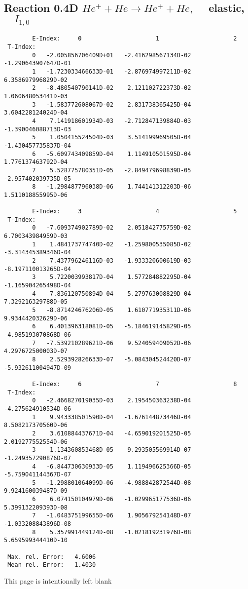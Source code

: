 \subsection{
Reaction 0.4D  $He^+ + He \rightarrow He^+ + He ,\quad$
 elastic, $\quad I_{1,0}$
}

\begin{verbatim}
        E-Index:     0                     1                     2
 T-Index:
        0   -2.005856706409D+01   -2.416298567134D-02   -1.290643907647D-01
        1   -1.723033466633D-01   -2.876974997211D-02    6.358697996829D-02
        2   -8.480540790141D-02    2.121102722373D-02    1.060648053441D-03
        3   -1.583772608067D-02    2.831738365425D-04    3.604228124024D-04
        4    7.141918601934D-03   -2.712847139884D-03   -1.390046088713D-03
        5    1.050415524504D-03    3.514199969505D-04   -1.430457735837D-04
        6   -5.609743409859D-04    1.114910501595D-04    1.776137463792D-04
        7    5.528775780351D-05   -2.849479698839D-05   -2.957402039735D-05
        8   -1.298487796038D-06    1.744141312203D-06    1.511018855995D-06

        E-Index:     3                     4                     5
 T-Index:
        0   -7.609374902789D-02    2.051842775759D-02    6.700343984959D-03
        1    1.484173774740D-02   -1.259800535085D-02   -3.314345389346D-04
        2    7.437796246116D-03   -1.933320600619D-03   -8.197110013265D-04
        3    5.722003993817D-04    1.577284882295D-04   -1.165904265498D-04
        4   -7.836120750894D-04    5.279763008829D-04    7.329216329788D-05
        5   -8.871424676206D-05    1.610771935311D-06    9.934442032629D-06
        6    6.401396318081D-05   -5.184619145829D-05   -4.985193070868D-06
        7   -7.539210289621D-06    9.524059409052D-06    4.297672500003D-07
        8    2.529392826633D-07   -5.084304524420D-07   -5.932611004947D-09

        E-Index:     6                     7                     8
 T-Index:
        0   -2.466827019035D-03    2.195450363238D-04   -4.275624910534D-06
        1    9.943338501590D-04   -1.676144873446D-04    8.508217370560D-06
        2    3.610884437671D-04   -4.659019201525D-05    2.019277552554D-06
        3    1.134360853468D-05    9.293505569914D-07   -1.249357290876D-07
        4   -6.844730630933D-05    1.119496625366D-05   -5.759041144367D-07
        5   -1.298801064099D-06   -4.988842872544D-08    9.924160039487D-09
        6    6.074150104979D-06   -1.029965177536D-06    5.399132209393D-08
        7   -1.048375199655D-06    1.905679254148D-07   -1.033208843896D-08
        8    5.357991449124D-08   -1.021819231976D-08    5.659599344410D-10

 Max. rel. Error:   4.6006
 Mean rel. Error:   1.4030

\end{verbatim}
\newpage
This page is intentionally left blank
\newpage

